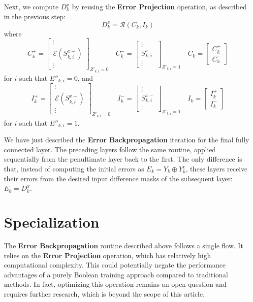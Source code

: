 \documentclass{article}
\theoremstyle{definition}
\theoremstyle{remark}
\begin{document}
Next, we compute \( D^x_k \) by reusing the \textbf{Error Projection} operation, as described in the previous step:
\[ D^x_k = \mathcal{R}(C_k, I_k) \]
where
\[
    C^+_k = \begin{bmatrix} \vdots \\ \mathcal{E}(S^{x+}_{k,i}) \\ \vdots \end{bmatrix}_{Z'_{k,i} = 0} \quad
    C^-_k = \begin{bmatrix} \vdots \\ S^{x-}_{k,i} \\ \vdots \end{bmatrix}_{Z'_{k,i} = 1} \quad
    C_k = \begin{bmatrix} C^+_k \\ C^-_k \end{bmatrix}
\]
for \( i \) such that \( E''_{k,i} = 0 \), and
\[
    I^+_k = \begin{bmatrix} \vdots \\ \mathcal{E}(S^{x+}_{k,i}) \\ \vdots \end{bmatrix}_{Z'_{k,i} = 0} \quad
    I^-_k = \begin{bmatrix} \vdots \\ S^{x-}_{k,i} \\ \vdots \end{bmatrix}_{Z'_{k,i} = 1} \quad
    I_k = \begin{bmatrix} I^+_k \\ I^-_k \end{bmatrix}
\]
for \( i \) such that \( E''_{k,i} = 1 \).

We have just described the \textbf{Error Backpropagation} iteration for the final fully connected layer. The preceding layers follow the same routine, applied sequentially from the penultimate layer back to the first. The only difference is that, instead of computing the initial errors as \( E_k = Y_k \oplus Y^e_k \), these layers receive their errors from the desired input difference masks of the subsequent layer: \( E_k = D^x_k \).

\section{Specialization}
The \textbf{Error Backpropagation} routine described above follows a single flow. It relies on the \textbf{Error Projection} operation, which has relatively high computational complexity. This could potentially negate the performance advantages of a purely Boolean training approach compared to traditional methods. In fact, optimizing this operation remains an open question and requires further research, which is beyond the scope of this article.
\end{document}
